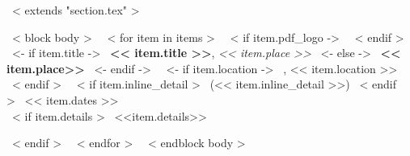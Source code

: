 ~< extends "section.tex" >~

~< block body >~
~< for item in items >~
    ~< if item.pdf_logo ->~
    ~< endif >~
    ~<- if item.title ->~
    \textbf{<< item.title >>}, \emph{<< item.place >>}
    ~<- else ->~
    \textbf{<< item.place>>}
    ~<- endif ->~
    ~<- if item.location ->~
    , << item.location >>
    ~< endif >~
    ~< if item.inline_detail >~
    {\footnotesize \color{gray} (<< item.inline_detail >>)}
    ~< endif >~
    \hfill << item.dates >> \\
    ~< if item.details >~
    {\small <<item.details>>} \par
    ~< endif >~
~< endfor >~
\vspace{-8mm}
~< endblock body >~